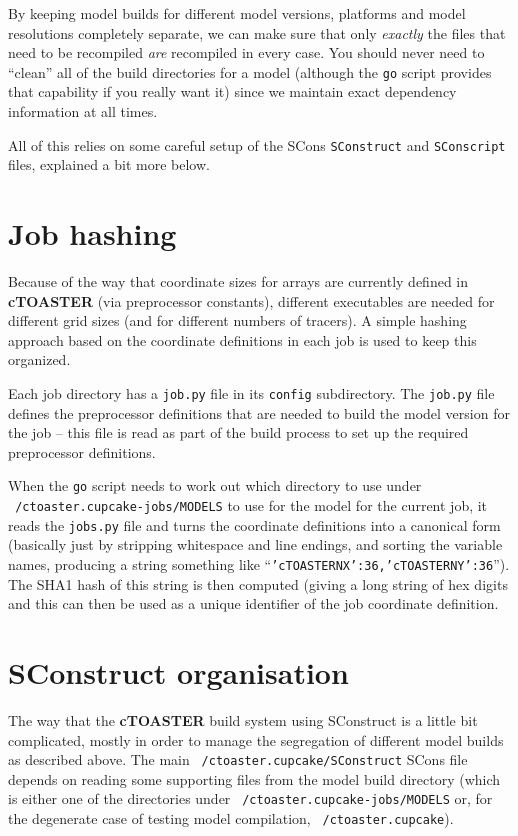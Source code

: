 \documentclass[a4paper,10pt,article]{memoir}
\begin{document}
By keeping model builds for different model versions, platforms and
model resolutions completely separate, we can make sure that only
\emph{exactly} the files that need to be recompiled \emph{are}
recompiled in every case.  You should never need to ``clean'' all of
the build directories for a model (although the \texttt{go} script
provides that capability if you really want it) since we maintain
exact dependency information at all times.

All of this relies on some careful setup of the SCons
\texttt{SConstruct} and \texttt{SConscript} files, explained a bit
more below.

\section{Job hashing}

Because of the way that coordinate sizes for arrays are currently
defined in \textbf{cTOASTER} (via preprocessor constants), different executables
are needed for different grid sizes (and for different numbers of
tracers).  A simple hashing approach based on the coordinate
definitions in each job is used to keep this organized.

Each job directory has a \texttt{job.py} file in its \texttt{config}
subdirectory.  The \texttt{job.py} file defines the preprocessor
definitions that are needed to build the model version for the job --
this file is read as part of the build process to set up the required
preprocessor definitions.

When the \texttt{go} script needs to work out which directory to use
under 
\\\texttt{~/ctoaster.cupcake-jobs/MODELS} to use for the model for the
current job, it reads the \texttt{jobs.py} file and turns the
coordinate definitions into a canonical form (basically just by
stripping whitespace and line endings, and sorting the variable names,
producing a string something like
``\texttt{'cTOASTERNX':36,'cTOASTERNY':36}'').  The SHA1 hash of this string
is then computed (giving a long string of hex digits and this can then
be used as a unique identifier of the job coordinate definition.

\section{SConstruct organisation}

The way that the \textbf{cTOASTER} build system using SConstruct is a little bit
complicated, mostly in order to manage the segregation of different
model builds as described above.  The main
\texttt{~/ctoaster.cupcake/SConstruct} SCons file depends on reading some
supporting files from the model build directory (which is either one
of the directories under \texttt{~/ctoaster.cupcake-jobs/MODELS} or, for the
degenerate case of testing model compilation, \texttt{~/ctoaster.cupcake}).
\end{document}
